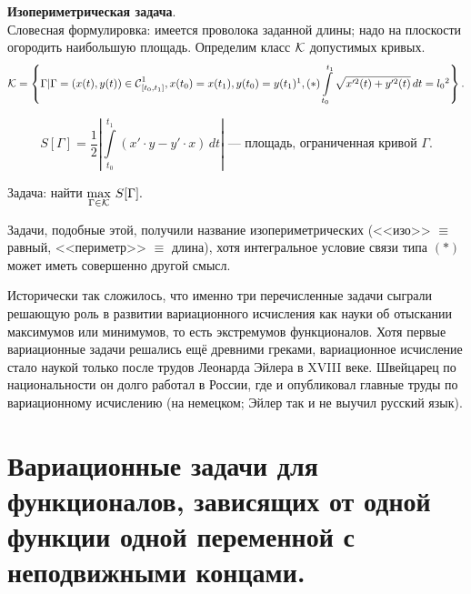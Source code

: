 \begin{enumerate2}
	\item \textbf{Изопериметрическая задача}.\\
	Словесная формулировка: имеется проволока заданной длины; надо на плоскости огородить наибольшую площадь. Определим класс $\mathcal{K}$ допустимых кривых.
	\label{l1:eq:Isoperimetr} 
	\begin{equation*}
		\mc{K}=\left\{\Gamma|\Gamma=(x(t),y(t))\in\Cfn[{[t_0,t_1]}]{1}, x(t_0)=x(t_1), y(t_0)=y(t_1)\footnotemark{}, (*)\int\limits_{t_0}^{t_1}\sqrt{x^{\prime 2}(t)+y^{\prime 2}(t)}\,dt=l_0\footnotemark{}\right\}.
	\end{equation*}
	\addtocounter{footnote}{-1}\addtocounter{footnote}{1}
	\begin{equation*}
		S[\Gamma]=\frac12\left|\int\limits_{t_0}^{t_1}\left(x'\cdot y-y'\cdot x\right)\,dt\right|\text{ --- площадь, ограниченная кривой }\Gamma.
	\end{equation*}
	
	Задача: найти $\max\limits_{\Gamma\in\mathcal{K}}\,S[\Gamma].$
	
	Задачи, подобные этой, получили название изопериметрических (<<изо>> $\equiv$ равный,  <<периметр>> $\equiv$ длина), хотя интегральное условие связи типа $(\hyperref[l1:eq:Isoperimetr]{*})$ может иметь совершенно другой смысл.
\end{enumerate2}

Исторически так сложилось, что именно три перечисленные задачи сыграли решающую роль в развитии вариационного исчисления как науки об отыскании максимумов или минимумов, то есть экстремумов функционалов. Хотя первые вариационные задачи решались ещё древними греками, вариационное исчисление стало наукой только после трудов Леонарда Эйлера в XVIII веке. Швейцарец по национальности он долго работал в России, где и опубликовал главные труды по вариационному исчислению (на немецком; Эйлер так и не выучил русский язык). 

\section[Задачи с неподвижными концами.]{Вариационные задачи для функционалов, зависящих от одной функции одной переменной с неподвижными концами.}
\label{lecture1section2}

